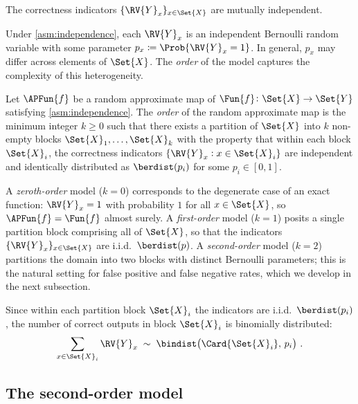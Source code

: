 \documentclass[ ../main.tex]{subfiles}
\begin{document}
\begin{assumption}
\label{asm:independence}
The correctness indicators $\{\RV{Y}_x\}_{x \in \Set{X}}$ are mutually
independent.
\end{assumption}

Under \cref{asm:independence}, each $\RV{Y}_x$ is an independent Bernoulli
random variable with some parameter $p_x \coloneqq \Prob{\RV{Y}_x = 1}$.
In general, $p_x$ may differ across elements of $\Set{X}$.
The \emph{order} of the model captures the complexity of this heterogeneity.

\begin{definition}
\label{def:model_order}
Let $\APFun{f}$ be a random approximate map of $\Fun{f} \colon \Set{X} \to
\Set{Y}$ satisfying \cref{asm:independence}.
The \emph{order} of the random approximate map is the minimum integer $k \geq 0$
such that there exists a partition of $\Set{X}$ into $k$ non-empty blocks
$\Set{X}_1, \ldots, \Set{X}_k$ with the property that within each block
$\Set{X}_i$, the correctness indicators $\{\RV{Y}_x : x \in \Set{X}_i\}$ are
independent and identically distributed as $\berdist(p_i)$ for some
$p_i \in [0,1]$.
\end{definition}

\begin{remark}
A \emph{zeroth-order} model ($k=0$) corresponds to the degenerate case of an
exact function: $\RV{Y}_x = 1$ with probability $1$ for all $x \in \Set{X}$,
so $\APFun{f} = \Fun{f}$ almost surely.
A \emph{first-order} model ($k=1$) posits a single partition block comprising
all of $\Set{X}$, so that the indicators $\{\RV{Y}_x\}_{x \in \Set{X}}$ are
i.i.d.\ $\berdist(p)$.
A \emph{second-order} model ($k=2$) partitions the domain into two blocks with
distinct Bernoulli parameters; this is the natural setting for false positive
and false negative rates, which we develop in the next subsection.
\end{remark}

Since within each partition block $\Set{X}_i$ the indicators are i.i.d.\
$\berdist(p_i)$, the number of correct outputs in block $\Set{X}_i$ is
binomially distributed:
\begin{equation}
\label{eq:binom_block}
    \sum_{x \in \Set{X}_i} \RV{Y}_x
    \;\sim\; \bindist\!\left(\Card{\Set{X}_i},\, p_i\right)\,.
\end{equation}

\subsection{The second-order model}
\label{sec:second_order}
\end{document}
